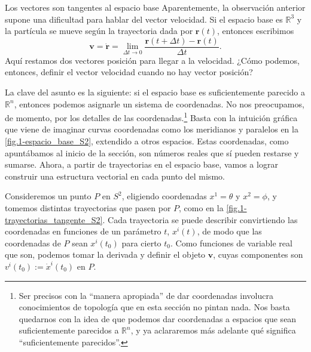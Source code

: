 \begin{observation}{Los vectores son tangentes al espacio base}
    \label{obs.1-espacio_tangente}
    Aparentemente, la observación anterior supone una dificultad para hablar del vector velocidad. Si el espacio base es \(\mathbb{R}^3\) y la partícula se mueve según la trayectoria dada por \(\mathbf{r}(t)\), entonces escribimos 
    \begin{equation}
        \mathbf{v} = \dot{\mathbf{r}} = \lim_{\Delta t\rightarrow0}\frac{\mathbf{r}(t+\Delta t) - \mathbf{r}(t)}{\Delta t}.
    \end{equation}
    Aquí restamos dos vectores posición para llegar a la velocidad. ¿Cómo podemos, entonces, definir el vector velocidad cuando no hay vector posición? 
    
    La clave del asunto es la siguiente: si el espacio base es suficientemente parecido a \(\mathbb{R}^n\), entonces podemos asignarle un sistema de coordenadas. No nos preocupamos, de momento, por los detalles de las coordenadas.\footnote{Ser precisos con la ``manera apropiada'' de dar coordenadas involucra conocimientos de topología que en esta sección no pintan nada. Nos basta quedarnos con la idea de que podemos dar coordenadas a espacios que sean suficientemente parecidos a \(\mathbb{R}^n\), y ya aclararemos más adelante qué significa ``suficientemente parecidos''.} Basta con la intuición gráfica que viene de imaginar curvas coordenadas como los meridianos y paralelos en la \cref{fig.1-espacio_base_S2}, extendido a otros espacios. Estas coordenadas, como apuntábamos al inicio de la sección, son números reales que sí pueden restarse y sumarse. Ahora, a partir de trayectorias en el espacio base, vamos a lograr construir una estructura vectorial en cada punto del mismo.

    Consideremos un punto \(P\) en \(S^2\), eligiendo coordenadas \(x^1=\theta\) y \(x^2=\phi\), y tomemos distintas trayectorias que pasen por \(P\), como en la \cref{fig.1-trayectorias_tangente_S2}. Cada trayectoria se puede describir convirtiendo las coordenadas en funciones de un parámetro \(t\), \(x^i(t)\), de modo que las coordenadas de \(P\) sean \(x^i(t_0)\) para cierto \(t_0\). Como funciones de variable real que son, podemos tomar la derivada y definir el objeto \(\mathbf{v}\), cuyas componentes son \(v^i(t_0) := \dot{x}^i(t_0)\) en \(P\).


\end{observation}
